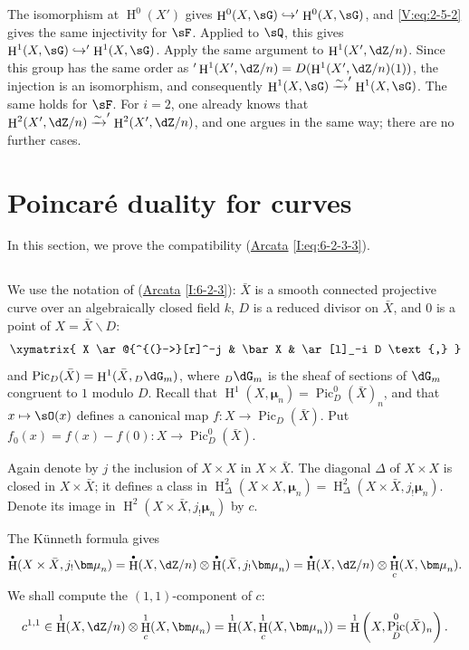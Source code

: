\documentclass[12pt,oneside,english]{smfbook}
\DeclareMathOperator{\h}{H}
\DeclareMathOperator{\pic}{Pic}
\newcommand{\dmu}{{\bm\mu}}
\newcommand{\iso}{\xrightarrow\sim}
\renewcommand{\setminus}{\smallsetminus}
\let\oldbullet\bullet
\renewcommand{\bullet}{\textnormal{\tiny$\oldbullet$}}
\begin{document}
The isomorphism at $\h^0(X')$ gives $\h^0(X,\sG)\hookrightarrow'\h^0(X,\sG)$, and \eqref{V:eq:2-5-2} gives the same injectivity for $\sF$. Applied to $\sQ$, this gives $\h^1(X,\sG)\hookrightarrow'\h^1(X,\sG)$. Apply the same argument to $\h^1(X',\dZ/n)$. Since this group has the same order as $'\h^1(X',\dZ/n)=D(\h^1(X',\dZ/n)(1))$, the injection is an isomorphism, and consequently $\h^1(X,\sG)\iso'\h^1(X,\sG)$. The same holds for $\sF$. For $i=2$, one already knows that $\h^2(X',\dZ/n)\iso'\h^2(X',\dZ/n)$, and one argues in the same way; there are no further cases.

\section{Poincaré duality for curves}\label{V:3}

In this section, we prove the compatibility (\hyperref[I]{Arcata} \ref{I:eq:6-2-3-3}).

\subsection{}\label{V:3-1}

We use the notation of (\hyperref[I]{Arcata} \ref{I:6-2-3}): $\bar X$ is a smooth connected projective curve over an algebraically closed field $k$, $D$ is a reduced divisor on $\bar X$, and $0$ is a point of $X=\bar X\setminus D$:
\[\xymatrix{
  X \ar@{^{(}->}[r]^-j
    & \bar X
    & \ar[l]_-i D \text{,}
}\]
and $\pic_D(\bar X)=\h^1(\bar X,{}_{D}\dG_m)$, where ${}_{D}\dG_m$ is the sheaf of sections of $\dG_m$ congruent to $1$ modulo $D$. Recall that $\h^1(X,\dmu_n)=\pic_D^0(\bar X)_n$, and that $x\mapsto\sO(x)$ defines a canonical map $f:X\to\pic_D(\bar X)$. Put $f_0(x)=f(x)-f(0):X\to\pic_D^0(\bar X)$.

Again denote by $j$ the inclusion of $X\times X$ in $X\times\bar X$. The diagonal $\Delta$ of $X\times X$ is closed in $X\times\bar X$; it defines a class in $\h_\Delta^2(X\times X,\dmu_n) =\h_\Delta^2(X\times\bar X,j_!\dmu_n)$. Denote its image in $\h^2(X\times\bar X,j_!\dmu_n)$ by $c$.

The K\"unneth formula gives
\[
  \h^\bullet(X\times \bar X,j_!\dmu_n) = \h^\bullet(X,\dZ/n)\otimes \h^\bullet(\bar X,j_!\dmu_n) = \h^\bullet(X,\dZ/n)\otimes \h_c^\bullet(X,\dmu_n) \text{.}
\]
We shall compute the $(1,1)$-component of $c$:
\[
  c^{1,1} \in \h^1(X,\dZ/n)\otimes \h_c^1(X,\dmu_n) = \h^1(X,\h_c^1(X,\dmu_n)) = \h^1\left(X,\pic_D^0(\bar X)_n\right) \text{.}
\]
\end{document}
